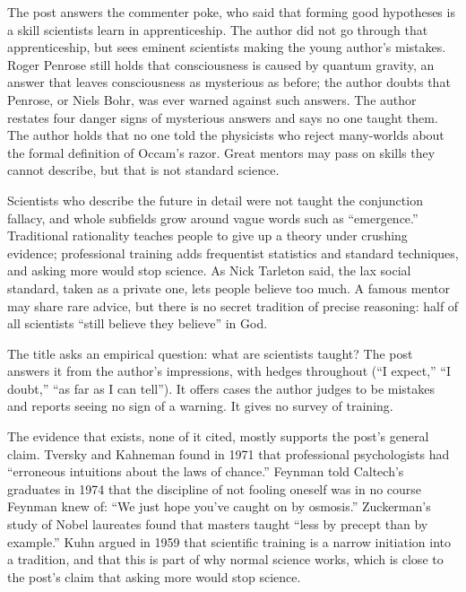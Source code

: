 \begin{afterword}
\summaryhead

The post answers the commenter poke, who said that forming good hypotheses is a skill scientists learn in apprenticeship. The author did not go through that apprenticeship, but sees eminent scientists making the young author's mistakes. Roger Penrose still holds that consciousness is caused by quantum gravity, an answer that leaves consciousness as mysterious as before; the author doubts that Penrose, or Niels Bohr, was ever warned against such answers. The author restates four danger signs of mysterious answers and says no one taught them. The author holds that no one told the physicists who reject many-worlds about the formal definition of Occam's razor. Great mentors may pass on skills they cannot describe, but that is not standard science.

Scientists who describe the future in detail were not taught the conjunction fallacy, and whole subfields grow around vague words such as ``emergence.'' Traditional rationality teaches people to give up a theory under crushing evidence; professional training adds frequentist statistics and standard techniques, and asking more would stop science. As Nick Tarleton said, the lax social standard, taken as a private one, lets people believe too much. A famous mentor may share rare advice, but there is no secret tradition of precise reasoning: half of all scientists ``still believe they believe'' in God.

\responsehead

The title asks an empirical question: what are scientists taught? The post answers it from the author's impressions, with hedges throughout (``I expect,'' ``I doubt,'' ``as far as I can tell''). It offers cases the author judges to be mistakes and reports seeing no sign of a warning. It gives no survey of training.

The evidence that exists, none of it cited, mostly supports the post's general claim. Tversky and Kahneman found in 1971 that professional psychologists had ``erroneous intuitions about the laws of chance.'' Feynman told Caltech's graduates in 1974 that the discipline of not fooling oneself was in no course Feynman knew of: ``We just hope you've caught on by osmosis.'' Zuckerman's study of Nobel laureates found that masters taught ``less by precept than by example.'' Kuhn argued in 1959 that scientific training is a narrow initiation into a tradition, and that this is part of why normal science works, which is close to the post's claim that asking more would stop science.


\end{afterword}
